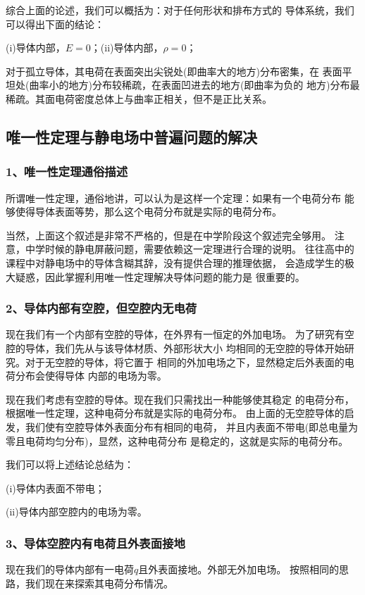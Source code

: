 综合上面的论述，我们可以概括为：对于任何形状和排布方式的
导体系统，我们可以得出下面的结论：
\begin{theorem}
    (i)导体内部，$E=0$；\quad (ii)导体内部，$\rho=0$；
\end{theorem}

对于孤立导体，其电荷在表面突出尖锐处(即曲率大的地方)分布密集，在 
表面平坦处(曲率小的地方)分布较稀疏，在表面凹进去的地方(即曲率为负的
地方)分布最稀疏。其面电荷密度总体上与曲率正相关，但不是正比关系。

\subsection{唯一性定理与静电场中普遍问题的解决}
\subsubsection*{1、唯一性定理通俗描述}
\begin{theorem}
    所谓唯一性定理，通俗地讲，可以认为是这样一个定理：如果有一个电荷分布
    能够使得导体表面等势，那么这个电荷分布就是实际的电荷分布。
\end{theorem}

当然，上面这个叙述是非常不严格的，但是在中学阶段这个叙述完全够用。
注意，中学时候的静电屏蔽问题，需要依赖这一定理进行合理的说明。
往往高中的课程中对静电场中的导体含糊其辞，没有提供合理的推理依据，
会造成学生的极大疑惑，因此掌握利用唯一性定理解决导体问题的能力是
很重要的。

\subsubsection*{2、导体内部有空腔，但空腔内无电荷}
现在我们有一个内部有空腔的导体，在外界有一恒定的外加电场。
为了研究有空腔的导体，我们先从与该导体材质、外部形状大小
均相同的无空腔的导体开始研究。对于无空腔的导体，将它置于
相同的外加电场之下，显然稳定后外表面的电荷分布会使得导体
内部的电场为零。

现在我们考虑有空腔的导体。现在我们只需找出一种能够使其稳定
的电荷分布，根据唯一性定理，这种电荷分布就是实际的电荷分布。
由上面的无空腔导体的启发，我们使有空腔导体外表面分布有相同的电荷，
并且内表面不带电(即总电量为零且电荷均匀分布)，显然，这种电荷分布
是稳定的，这就是实际的电荷分布。

我们可以将上述结论总结为：

(i)导体内表面不带电；

(ii)导体内部空腔内的电场为零。
\subsubsection*{3、导体空腔内有电荷且外表面接地}
现在我们的导体内部有一电荷$q$且外表面接地。外部无外加电场。
按照相同的思路，我们现在来探索其电荷分布情况。

